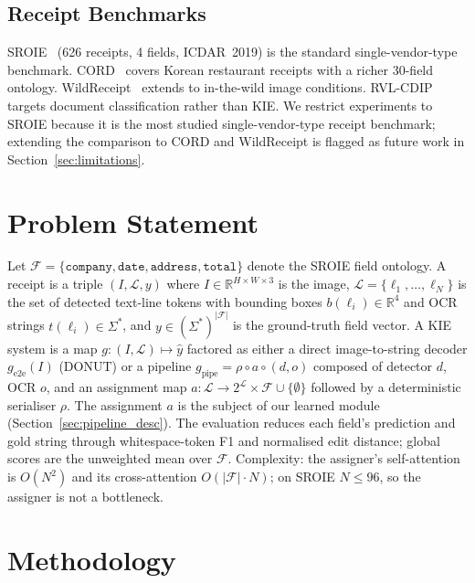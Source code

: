 \documentclass[conference]{IEEEtran}
\begin{document}
\subsection{Receipt Benchmarks}
SROIE~\cite{huang2019icdar} (626 receipts, 4 fields, ICDAR~2019) is
the standard single-vendor-type benchmark.  CORD~\cite{park2019cord}
covers Korean restaurant receipts with a richer 30-field ontology.
WildReceipt~\cite{sun2021wildreceipt} extends to in-the-wild image
conditions.  RVL-CDIP targets document classification rather than KIE.
We restrict experiments to SROIE because it is the most studied
single-vendor-type receipt benchmark; extending the comparison to
CORD and WildReceipt is flagged as future work in
Section~\ref{sec:limitations}.


\section{Problem Statement}
\label{sec:formal}

Let $\mathcal{F}=\{\texttt{company},\texttt{date},\texttt{address},
\texttt{total}\}$ denote the SROIE field ontology.  A receipt is a
triple $(I, \mathcal{L}, y)$ where $I \in \mathbb{R}^{H\times W\times 3}$
is the image, $\mathcal{L}=\{\ell_1,\ldots,\ell_N\}$ is the set of
detected text-line tokens with bounding boxes $b(\ell_i)\in\mathbb{R}^4$
and OCR strings $t(\ell_i)\in\Sigma^*$, and
$y\in(\Sigma^*)^{|\mathcal{F}|}$ is the ground-truth field vector.
A KIE system is a map $g:(I,\mathcal{L})\mapsto\hat{y}$ factored as
either a direct image-to-string decoder $g_{\text{e2e}}(I)$ (DONUT)
or a pipeline $g_{\text{pipe}}=\rho\circ a\circ(d,o)$ composed of
detector $d$, OCR $o$, and an assignment map
$a:\mathcal{L}\to2^{\mathcal{L}}\times\mathcal{F}\cup\{\emptyset\}$
followed by a deterministic serialiser $\rho$.  The assignment $a$ is
the subject of our learned module (Section~\ref{sec:pipeline_desc}).
The evaluation reduces each field's prediction and gold string through
whitespace-token F1 and normalised edit distance; global scores are
the unweighted mean over $\mathcal{F}$.  Complexity: the assigner's
self-attention is $O(N^2)$ and its cross-attention
$O(|\mathcal{F}|\cdot N)$; on SROIE $N\le 96$, so the assigner is not
a bottleneck.


\section{Methodology}
\end{document}
